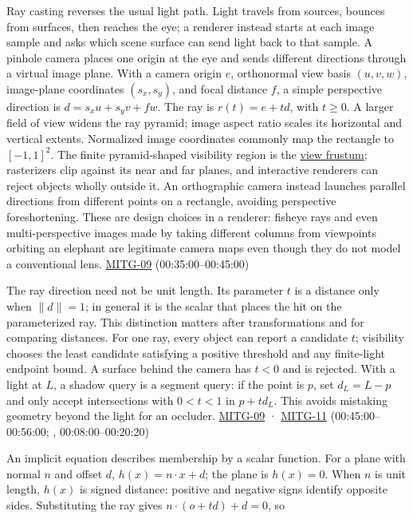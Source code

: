 Ray casting reverses the usual light path. Light travels from sources, bounces from surfaces, then reaches the eye; a renderer instead starts at each image sample and asks which scene surface can send light back to that sample. A pinhole camera places one origin at the eye and sends different directions through a virtual image plane. With a camera origin \(e\), orthonormal view basis \((u,v,w)\), image-plane coordinates \((s_x,s_y)\), and focal distance \(f\), a simple perspective direction is \(d=s_xu+s_yv+fw\). The ray is \(r(t)=e+td\), with \(t\geq 0\). A larger field of view widens the ray pyramid; image aspect ratio scales its horizontal and vertical extents. Normalized image coordinates commonly map the rectangle to \([-1,1]^2\). The finite pyramid-shaped visibility region is the \hyperref[appendix-1c07d64f5e70]{view frustum}; rasterizers clip against its near and far planes, and interactive renderers can reject objects wholly outside it. An orthographic camera instead launches parallel directions from different points on a rectangle, avoiding perspective foreshortening. These are design choices in a renderer: fisheye rays and even multi-perspective images made by taking different columns from viewpoints orbiting an elephant are legitimate camera maps even though they do not model a conventional lens. \hyperref[04-visual-computing-ii-ch036]{MITG-09} (00:35:00--00:45:00)

The ray direction need not be unit length. Its parameter \(t\) is a distance only when \(\|d\|=1\); in general it is the scalar that places the hit on the parameterized ray. This distinction matters after transformations and for comparing distances. For one ray, every object can report a candidate \(t\); visibility chooses the least candidate satisfying a positive threshold and any finite-light endpoint bound. A surface behind the camera has \(t<0\) and is rejected. With a light at \(L\), a shadow query is a segment query: if the point is \(p\), set \(d_L=L-p\) and only accept intersections with \(0<t<1\) in \(p+td_L\). This avoids mistaking geometry beyond the light for an occluder. \hyperref[04-visual-computing-ii-ch036]{MITG-09} · \hyperref[04-visual-computing-ii-ch036]{MITG-11} (00:45:00--00:56:00; , 00:08:00--00:20:20)

An implicit equation describes membership by a scalar function. For a plane with normal \(n\) and offset \(d\), \(h(x)=n\cdot x+d\); the plane is \(h(x)=0\). When \(n\) is unit length, \(h(x)\) is signed distance: positive and negative signs identify opposite sides. Substituting the ray gives \(n\cdot(o+td)+d=0\), so

